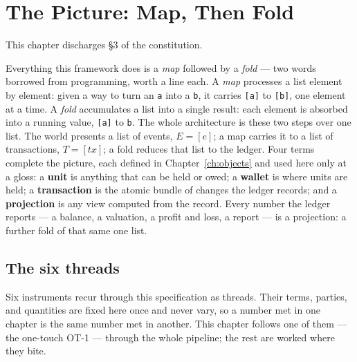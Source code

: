 \section{The Picture: Map, Then Fold}\label{ch:picture}

This chapter discharges \S3 of the constitution.

Everything this framework does is a \emph{map} followed by a \emph{fold} --- two words
borrowed from programming, worth a line each. A \emph{map} processes a list element by
element: given a way to turn an \texttt{a} into a \texttt{b}, it carries \texttt{[a]} to
\texttt{[b]}, one element at a time. A \emph{fold} accumulates a list into a single
result: each element is absorbed into a running value, \texttt{[a]} to \texttt{b}. The
whole architecture is these two steps over one list. The world presents a list of
events, $E = [e]$; a map carries it to a list of transactions, $T = [tx]$; a fold
reduces that list to the ledger. Four terms complete the picture, each defined in
Chapter~\ref{ch:objects} and used here only at a gloss: a \textbf{unit} is anything that
can be held or owed; a \textbf{wallet} is where units are held; a \textbf{transaction} is
the atomic bundle of changes the ledger records; and a \textbf{projection} is any view
computed from the record. Every number the ledger reports --- a balance, a valuation, a
profit and loss, a report --- is a projection: a further fold of that same one list.

\subsection{The six threads}

Six instruments recur through this specification as threads. Their terms, parties, and
quantities are fixed here once and never vary, so a number met in one chapter is the same
number met in another. This chapter follows one of them --- the one-touch OT-1 ---
through the whole pipeline; the rest are worked where they bite.

